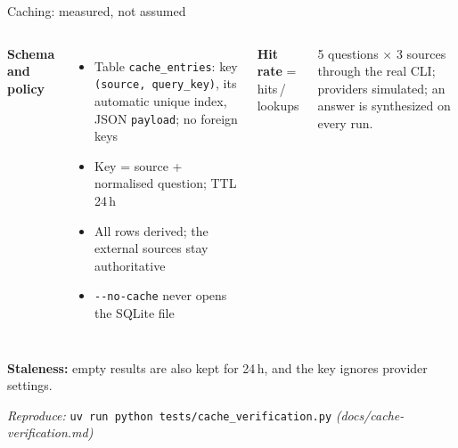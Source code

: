 \documentclass[aspectratio=169,11pt]{beamer}
\newcommand{\statTile}[6]{%
  \node[card=#3, minimum width=#2 cm, minimum height=1.6cm, anchor=north west]
    at (#1,0) {};
  \node[anchor=center, text=#3, font=#4\bfseries] at (#1+#2/2,-0.5) {#5};
  \node[anchor=north, text width=\dimexpr#2cm-0.3cm\relax, align=center,
    font=\scriptsize, text=black!70] at (#1+#2/2,-0.92) {#6};
}
\begin{document}
\begin{frame}{Caching: measured, not assumed}
  \begin{columns}[T,onlytextwidth]
  \textbf{Schema and policy}
  \begin{itemize}\small\setlength\itemsep{0.3em}
    \item Table \texttt{cache\_entries}: key \texttt{(source, query\_key)}, its automatic
      unique index, JSON \texttt{payload}; no foreign keys
    \item Key = source + normalised question; TTL 24\,h
    \item All rows derived; the external sources stay authoritative
    \item \texttt{-{}-no-cache} never opens the SQLite file
  \end{itemize}

  \textbf{Hit rate} = hits\,/\,lookups
  \vspace{0.4em}

  \vspace{0.3em}

  {\scriptsize 5 questions $\times$ 3 sources through the real CLI; providers simulated;
  an answer is synthesized on every run.}
  \end{columns}

  \vspace{0.6em}
  \textbf{Staleness:} empty results are also kept for 24\,h, and the key ignores provider settings.

  \vspace{0.3em}
  {\footnotesize\textit{Reproduce:} \texttt{uv run python tests/cache\_verification.py}
  \enspace\textit{(docs/cache-verification.md)}}
\end{frame}
\end{document}
